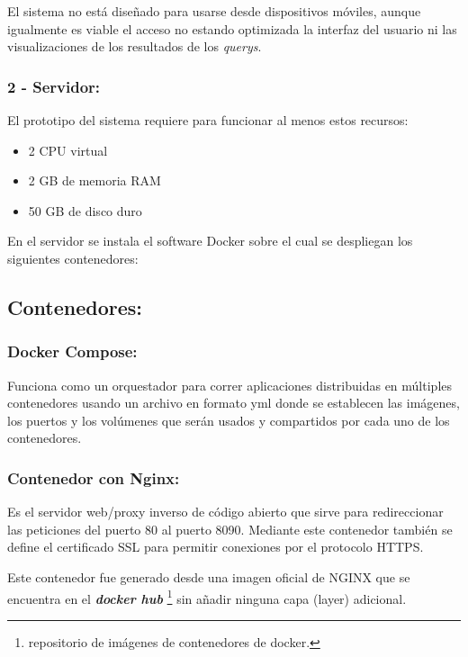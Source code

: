 \documentclass[
  10,
  openany]{book}
\providecommand{\tightlist}{%
  \setlength{\itemsep}{0pt}\setlength{\parskip}{0pt}}
\begin{document}
El sistema no está diseñado para usarse desde dispositivos móviles, aunque igualmente es viable el acceso no estando optimizada la interfaz del usuario ni las visualizaciones de los resultados de los \emph{querys}.

\hypertarget{servidor}{%
\subsubsection{2 - Servidor:}\label{servidor}}

El prototipo del sistema requiere para funcionar al menos estos recursos:

\begin{itemize}
\tightlist
\item
  2 CPU virtual
\item
  2 GB de memoria RAM
\item
  50 GB de disco duro
\end{itemize}

En el servidor se instala el software Docker sobre el cual se despliegan los siguientes contenedores:

\hypertarget{contenedores}{%
\subsection{Contenedores:}\label{contenedores}}

\hypertarget{docker-compose}{%
\subsubsection{Docker Compose:}\label{docker-compose}}

Funciona como un orquestador para correr aplicaciones distribuidas en múltiples contenedores usando un archivo en formato yml donde se establecen las imágenes, los puertos y los volúmenes que serán usados y compartidos por cada uno de los contenedores.

\hypertarget{contenedor-con-nginx}{%
\subsubsection{Contenedor con Nginx:}\label{contenedor-con-nginx}}

Es el servidor web/proxy inverso de código abierto que sirve para redireccionar las peticiones del puerto 80 al puerto 8090. Mediante este contenedor también se define el certificado SSL para permitir conexiones por el protocolo HTTPS.

Este contenedor fue generado desde una imagen oficial de NGINX que se encuentra en el \textbf{\emph{docker hub}} \footnote{repositorio de imágenes de contenedores de docker.} sin añadir ninguna capa (layer) adicional.
\end{document}
